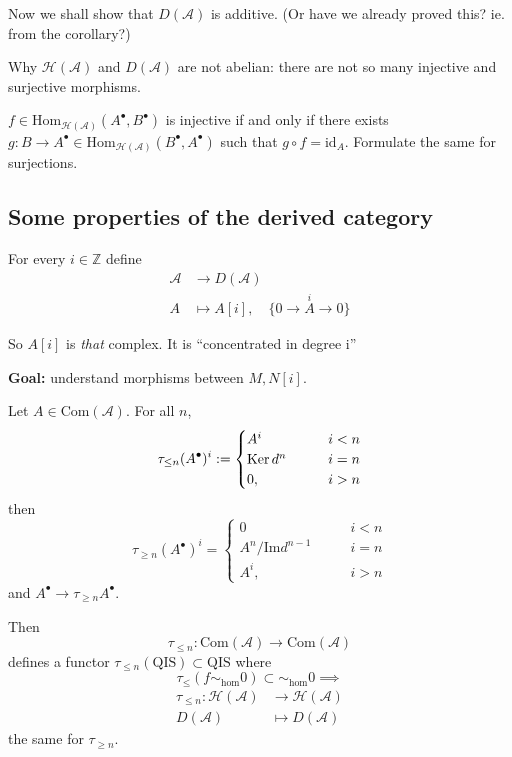 \bigskip\noindent
Now we shall show that $D(\mathcal{A})$ is additive. (Or have we already proved
this? ie. from the corollary?)

\bigskip\noindent
Why $\mathcal{H}(\mathcal{A})$ and $D(\mathcal{A})$ are not abelian: there are
not so many injective and surjective morphisms.

\begin{exercise}
\label{exercise-no-injective-surjective-morphisms-in-derived-categories}
$f \in \text{Hom}_{\mathcal{H}(\mathcal{A})} (A^{\bullet},B^{\bullet})$ is
injective if and only if there exists  $g: B \to A^{\bullet} \in
\text{Hom}_{\mathcal{H}(\mathcal{A})} (B^{\bullet},A^{\bullet})$ such that $g
\circ f=\text{id}_A$. Formulate the same for surjections.
\end{exercise}

\subsection*{Some properties of the derived category}
\label{subsection-some-properties-of-the-derived-category}

For every $i \in \mathbb{Z}$ define
\begin{align*}
\mathcal{A} &\longrightarrow D(\mathcal{A}) \\
A &\longmapsto A[i], \quad \{0 \to \overset{i}{A} \to 0\}
\end{align*}

So $A[i]$ is {\it that} complex. It is ``concentrated in degree i''

{\bf Goal:} understand morphisms between $M,N[i]$.

\begin{definition}
\label{definition-embedding-in-Com}
Let $A \in \text{Com}(\mathcal{A})$. For all $n$, 
$$
\tau_{\leq n}(A^{\bullet})^i:=\begin{cases}
A^i\qquad &i<n \\
\mathop{\mathrm{Ker}} d^n\qquad &i=n\\
0,\quad &i>n
\end{cases}
$$ 
then 
$$
\tau_{\geq  n}(A^{\bullet})^i=\begin{cases}
0\qquad
 &i<n \\
A^n/\text{Im}d^{n-1}\qquad &i=n\\
A^i,\qquad &i>n
\end{cases}
$$
and $A^{\bullet}\to\tau_{\geq n}A^{\bullet}$.
\end{definition}

Then
$$
\tau_{\leq n}:\text{Com}(\mathcal{A}) \to \text{Com}(\mathcal{A})
$$
defines a functor $\tau_{\leq n}(\text{QIS})\subset \text{QIS}$ 
where 
$$
\tau_{\leq }(f \sim _{\text{hom}}0) \subset \sim_{\text{hom}}0
\implies
$$
\begin{align*}
\tau_{\leq n}: \mathcal{H}(\mathcal{A}) &\longrightarrow
\mathcal{H}(\mathcal{A}) \\
D(\mathcal{A}) &\longmapsto D(\mathcal{A})
\end{align*}
the same for $\tau_{\geq n}$.

